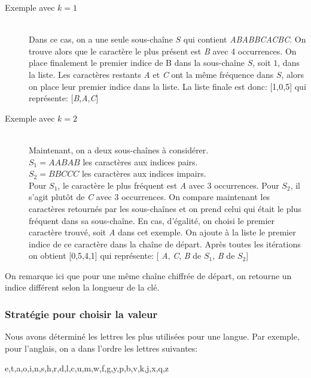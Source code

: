 \documentclass[11pt]{article}
\begin{document}
				\begin{description}
					\item[Exemple avec $k=1$]\mbox{}\\
					Dans ce cas, on a une seule sous-chaîne $S$ qui contient \emph{ABABBCACBC}.
					On trouve alors que le caractère le plus présent est \emph{B} avec 4 occurrences.
					On place finalement le premier indice de B dans la sous-chaîne $S$, soit $1$, dans la liste.
					Les caractères restants \emph{A} et \emph{C} ont la même fréquence dans $S$, alors on place leur premier indice dans la liste.
					La liste finale est donc: [1,0,5] qui représente: [\emph{B},\emph{A},\emph{C}]

					\item[Exemple avec $k=2$]\mbox{}\\
					Maintenant, on a deux sous-chaînes à considérer. \\
					$S_1 = AABAB$ les caractères aux indices pairs. \\
					$S_2 = BBCCC$ les caractères aux indices impairs. \\
					Pour $S_1$, le caractère le plus fréquent est \emph{A} avec 3 occurrences.
					Pour $S_2$, il s'agit plutôt de \emph{C} avec 3 occurrences.
					On compare maintenant les caractères retournés par les sous-chaînes et on prend celui qui était le plus fréquent dans sa sous-chaîne.
					En cas, d'égalité, on choisi le premier caractère trouvé, soit \emph{A} dans cet exemple.
					On ajoute à la liste le premier indice de ce caractère dans la chaîne de départ.
					Après toutes les itérations on obtient [0,5,4,1] qui représente: [ \emph{A}, \emph{C}, \emph{B} de $S_1$, \emph{B} de $S_2$]
				\end{description}

				On remarque ici que pour une même chaîne chiffrée de départ, on retourne un indice différent selon la longueur de la clé. \\

			\subsubsection{Stratégie pour choisir la valeur}
				Nous avons déterminé les lettres les plus utilisées pour une langue.
				Par exemple, pour l'anglais, on a dans l'ordre les lettres suivantes:
				\begin{center}
					e,t,a,o,i,n,s,h,r,d,l,c,u,m,w,f,g,y,p,b,v,k,j,x,q,z
				\end{center}
\end{document}
